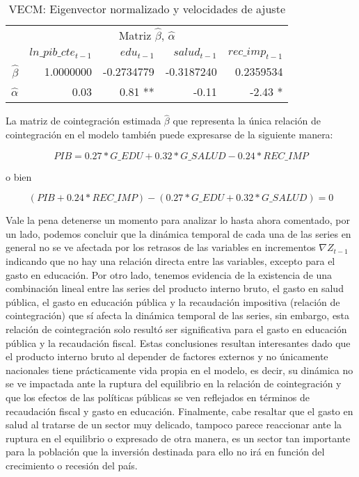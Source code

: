 \begin{table}[H]
\begin{center}
    \begin{tabular}{rrrrr}
    \hline
    \multicolumn{5}{c}{Matriz $\hat{\beta}$, $\hat{\alpha}$} \\
        \cline{1-5}
        			  				& $ln\_pib\_cte_{t-1}$		 		& $edu_{t-1}$			  			& $salud_{t-1}$			& $rec\_imp_{t-1}$  \\
        \hline
        $\hat{\beta}$						&	1.0000000					&	 -0.2734779  					&	 -0.3187240    		&	0.2359534	\\
        $\hat{\alpha}$						&	0.03							&	0.81 **		  				&	 -0.11 	    		&	-2.43 * 	 	\\
        \hline
    \end{tabular}
\end{center}
\caption {VECM: Eigenvector normalizado y velocidades de ajuste} \label{tab:ect1} 
\end{table}


 La matriz de cointegración estimada $\hat{\beta}$ que representa la única relación de cointegración en el modelo también puede expresarse de la siguiente manera:

\begin{equation}
PIB = 0.27*G\_EDU + 0.32*G\_SALUD - 0.24*REC\_IMP 
\end{equation}

o bien

\begin{equation} \label{eq:rel_coint2}
(PIB  + 0.24*REC\_IMP) - (0.27*G\_EDU + 0.32*G\_SALUD) =  0
\end{equation}


Vale la pena detenerse un momento para analizar lo hasta ahora comentado, por un lado, podemos concluir que la dinámica temporal de cada una de las series en general no se ve afectada por los retrasos de las variables en incrementos $\nabla Z_{t-1}$ indicando que no hay una relación directa entre las variables, excepto para el gasto en educación. Por otro lado, tenemos evidencia de la existencia de una combinación lineal entre las series del producto interno bruto, el gasto en salud pública, el gasto en educación pública y la recaudación impositiva (relación de cointegración) que sí afecta la dinámica temporal de las series, sin embargo, esta relación de cointegración solo resultó ser significativa para el gasto en educación pública y la recaudación fiscal. Estas conclusiones resultan interesantes dado que el producto interno bruto al depender de factores externos y no únicamente nacionales tiene prácticamente vida propia en el modelo, es decir, su dinámica no se ve impactada ante la ruptura del equilibrio en la relación de cointegración y que los efectos de las políticas públicas se ven reflejados en términos de recaudación fiscal y gasto en educación. Finalmente, cabe resaltar que el gasto en salud al tratarse de un sector muy delicado, tampoco parece reaccionar ante la ruptura en el equilibrio o expresado de otra manera, es un sector tan importante para la población que la inversión destinada para ello no irá en función del crecimiento o recesión del país.

